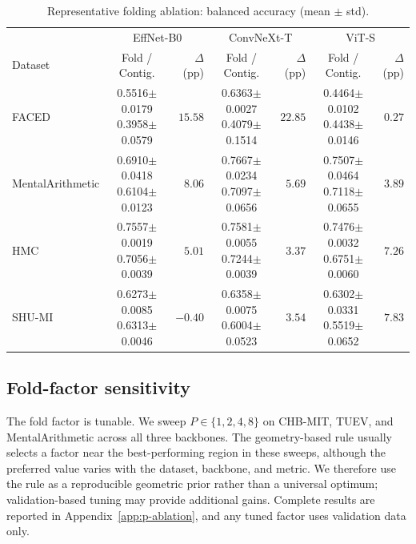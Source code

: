 \begin{table}[tbp]
\centering\footnotesize
\setlength{\tabcolsep}{3pt}
\caption{Representative folding ablation: balanced accuracy (mean $\pm$ std).}
\label{tab:fold-representative}
\begin{tabular}{@{}l*{3}{cr}@{}}
\toprule
 & \multicolumn{2}{c}{EffNet-B0} & \multicolumn{2}{c}{ConvNeXt-T} & \multicolumn{2}{c}{ViT-S} \\
\cmidrule(lr){2-3}\cmidrule(lr){4-5}\cmidrule(l){6-7}
Dataset & Fold / Contig. & $\Delta$ (pp) & Fold / Contig. & $\Delta$ (pp) & Fold / Contig. & $\Delta$ (pp) \\
\midrule
FACED & \shortstack{0.5516$\pm$0.0179\\0.3958$\pm$0.0579} & $15.58$ & \shortstack{0.6363$\pm$0.0027\\0.4079$\pm$0.1514} & $22.85$ & \shortstack{0.4464$\pm$0.0102\\0.4438$\pm$0.0146} & $0.27$ \\
\cmidrule(lr){1-7}
MentalArithmetic & \shortstack{0.6910$\pm$0.0418\\0.6104$\pm$0.0123} & $8.06$ & \shortstack{0.7667$\pm$0.0234\\0.7097$\pm$0.0656} & $5.69$ & \shortstack{0.7507$\pm$0.0464\\0.7118$\pm$0.0655} & $3.89$ \\
\cmidrule(lr){1-7}
HMC & \shortstack{0.7557$\pm$0.0019\\0.7056$\pm$0.0039} & $5.01$ & \shortstack{0.7581$\pm$0.0055\\0.7244$\pm$0.0039} & $3.37$ & \shortstack{0.7476$\pm$0.0032\\0.6751$\pm$0.0060} & $7.26$ \\
\cmidrule(lr){1-7}
SHU-MI & \shortstack{0.6273$\pm$0.0085\\0.6313$\pm$0.0046} & $-0.40$ & \shortstack{0.6358$\pm$0.0075\\0.6004$\pm$0.0523} & $3.54$ & \shortstack{0.6302$\pm$0.0331\\0.5519$\pm$0.0652} & $7.83$ \\
\bottomrule
\end{tabular}

\end{table}

\subsection{Fold-factor sensitivity}
\label{sec:fold-factor-sensitivity}

The fold factor is tunable. We sweep $P\in\{1,2,4,8\}$ on CHB-MIT, TUEV,
and MentalArithmetic across all three backbones. The geometry-based rule
usually selects a factor near the best-performing region in these sweeps,
although the preferred value varies with the dataset, backbone, and metric.
We therefore use the rule as a reproducible geometric prior rather than a
universal optimum; validation-based tuning may provide additional gains.
Complete results are reported in Appendix~\ref{app:p-ablation}, and any tuned
factor uses validation data only.
